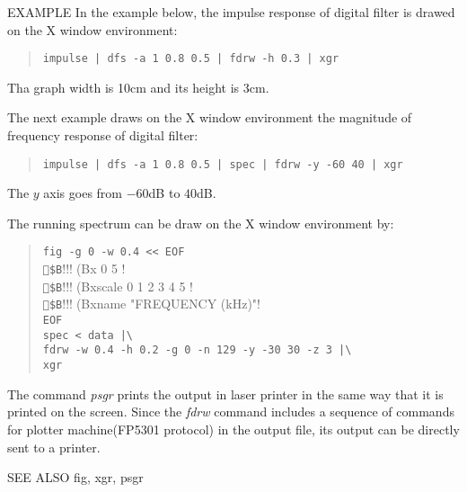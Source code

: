 \begin{qsection}{EXAMPLE}
In the example below, the impulse response of digital filter is
drawed on the X window environment:
\begin{quote}
  \verb!impulse | dfs -a 1 0.8 0.5 | fdrw -h 0.3 | xgr!
\end{quote}
Tha graph width is 10cm and its height is 3cm.
\par
The next example draws on the X window environment the magnitude of
frequency response of digital filter:
\begin{quote}
  \verb!impulse | dfs -a 1 0.8 0.5 | spec | fdrw -y -60 40 | xgr!
\end{quote}
The $y$ axis goes from $-60$dB to $40$dB.
\par
The running spectrum can be draw on the X window environment by:
\begin{quote}
 \verb!fig -g 0 -w 0.4 << EOF ! \\
 \verb!$B!!!!(Bx 0 5 !\\
 \verb!$B!!!!(Bxscale 0 1 2 3 4 5 !\\
 \verb!$B!!!!(Bxname "FREQUENCY (kHz)"!\\
 \verb!EOF!\\
 \verb!spec < data |\ !\\
 \verb!fdrw -w 0.4 -h 0.2 -g 0 -n 129 -y -30 30 -z 3 |\ !\\
 \verb!xgr !
\end{quote}
The command {\em psgr} prints the output in laser printer in the
same way that it is printed on the screen.
Since the {\em fdrw} command includes a sequence of commands
for plotter machine(FP5301 protocol) in the output file,
its output can be directly sent to a printer.
\end{qsection}

\begin{qsection}{SEE ALSO}
 fig, xgr, psgr
\end{qsection}
